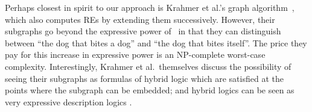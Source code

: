 Perhaps closest in spirit to our approach is Krahmer et al.'s graph
algorithm~, which also computes REs by
extending them successively.  However, their subgraphs go beyond the
expressive power of \alc\ in that they can distinguish between ``the
dog that bites a dog'' and ``the dog that bites itself''.  The price
they pay for this increase in expressive power is an NP-complete
worst-case complexity.  Interestingly, Krahmer et al.\ themselves
discuss the possibility of seeing their subgraphs as formulas of
hybrid logic which are satisfied at the points where the subgraph can
be embedded; and hybrid logics can be seen as very expressive
description logics \cite{arec:hybr05b}.











